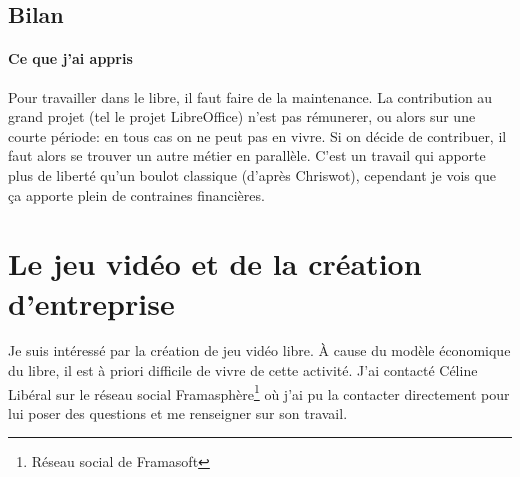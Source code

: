\documentclass[a4paper,12pt, draft]{report}
\begin{document}
\subsection{Bilan}
\paragraph{Ce que j'ai appris}
Pour travailler dans le libre, il faut faire de la maintenance.
La contribution au grand projet (tel le projet LibreOffice) n'est pas rémunerer, ou alors sur une courte période: en tous cas on ne peut pas en vivre. Si on décide de contribuer, il faut alors se trouver un autre métier en parallèle.
C'est un travail qui apporte plus de liberté qu'un boulot classique (d'après Chriswot), cependant je vois que ça apporte plein de contraines financières.


\section{Le jeu vidéo et de la création d'entreprise}
Je suis intéressé par la création de jeu vidéo libre. À cause du modèle économique du libre, il est à priori difficile de vivre de cette activité. J'ai contacté Céline Libéral sur le réseau social Framasphère\footnote{Réseau social de Framasoft} où j'ai pu la contacter directement pour lui poser des questions et me renseigner sur son travail.
\end{document}
